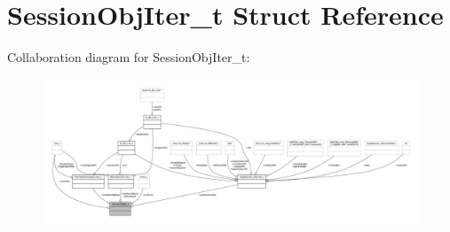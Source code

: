 \hypertarget{struct_session_obj_iter__t}{}\section{Session\+Obj\+Iter\+\_\+t Struct Reference}
\label{struct_session_obj_iter__t}


Collaboration diagram for Session\+Obj\+Iter\+\_\+t\+:
\nopagebreak
\begin{figure}[H]
\begin{center}
\leavevmode
\includegraphics[width=350pt]{struct_session_obj_iter__t__coll__graph}
\end{center}
\end{figure}
